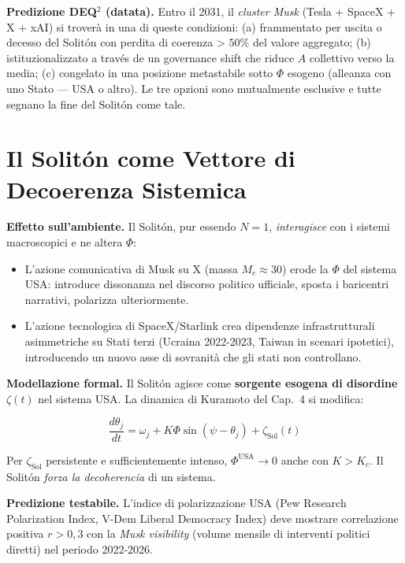 \Conj{} \textbf{Predizione DEQ$^2$ (datata).} Entro il 2031, il
\emph{cluster Musk} (Tesla + SpaceX + X + xAI) si troverà in una di
queste condizioni: (a) frammentato per uscita o decesso del Solitón con
perdita di coerenza \textgreater{} \(50\%\) del valore aggregato; (b)
istituzionalizzato a través de un governance shift che riduce \(A\)
collettivo verso la media; (c) congelato in una posizione metastabile
sotto \(\Phi\) esogeno (alleanza con uno Stato --- USA o altro). Le tre
opzioni sono mutualmente esclusive e tutte segnano la fine del Solitón
come tale.



\section{Il Solitón come Vettore di Decoerenza
Sistemica}\label{il-solitone-come-vettore-di-decoherencia-sistemica}

\Hypoth{} \textbf{Effetto sull'ambiente.} Il Solitón, pur essendo
\(N = 1\), \emph{interagisce} con i sistemi macroscopici e ne altera
\(\Phi\):

\begin{itemize}
\tightlist
\item
  L'azione comunicativa di Musk su X (massa \(M_e \approx 30\)) erode la
  \(\Phi\) del sistema USA: introduce dissonanza nel discorso politico
  ufficiale, sposta i baricentri narrativi, polarizza ulteriormente.
\item
  L'azione tecnologica di SpaceX/Starlink crea dipendenze
  infrastrutturali asimmetriche su Stati terzi (Ucraina 2022-2023,
  Taiwan in scenari ipotetici), introducendo un nuovo asse di sovranità
  che gli stati non controllano.
\end{itemize}

\Proved{} \textbf{Modellazione formal.} Il Solitón agisce come
\textbf{sorgente esogena di disordine} \(\zeta(t)\) nel sistema USA. La
dinamica di Kuramoto del Cap.~4 si modifica:

\[
\frac{d\theta_j}{dt} = \omega_j + K\Phi \sin(\psi - \theta_j) + \zeta_{\text{Sol}}(t)
\]

Per \(\zeta_{\text{Sol}}\) persistente e sufficientemente intenso,
\(\Phi^{\text{USA}} \to 0\) anche con \(K > K_c\). Il Solitón
\emph{forza la decoherencia} di un sistema.

\Conj{} \textbf{Predizione testabile.} L'indice di polarizzazione USA
(Pew Research Polarization Index, V-Dem Liberal Democracy Index) deve
mostrare correlazione positiva \(r > 0{,}3\) con la \emph{Musk
visibility} (volume mensile di interventi politici diretti) nel periodo
2022-2026.



